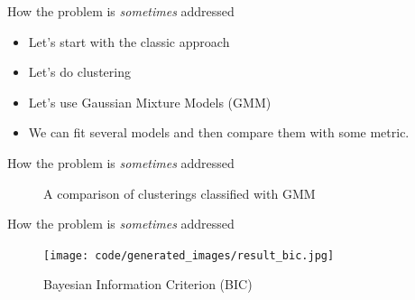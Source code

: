 \documentclass[handout]{beamer}
\begin{document}
\begin{frame}{How the problem is \textit{sometimes} addressed}
    \begin{itemize}
        \item Let's start with the classic approach
        \item Let's do clustering
        \item Let's use Gaussian Mixture Models (GMM)
        \item We can fit several models and then compare them with some metric.
    \end{itemize}
\end{frame}

\begin{frame}{How the problem is \textit{sometimes} addressed}
    \begin{figure}[H]
        \centering
        \quad
        \quad
        \quad
        \caption{A comparison of clusterings classified with GMM}
    \end{figure}
\end{frame}

\begin{frame}{How the problem is \textit{sometimes} addressed}
    \begin{figure}[H]
        \centering
        \texttt{[image: code/generated\_images/result\_bic.jpg]}
        \caption{Bayesian Information Criterion (BIC)}
    \end{figure}
\end{frame}
\end{document}
